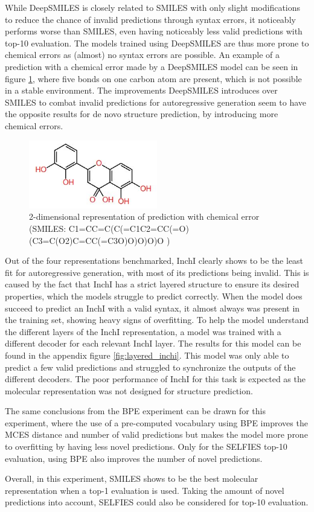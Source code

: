 While DeepSMILES is closely related to SMILES with only slight modifications to reduce the chance of invalid predictions through syntax errors, it noticeably performs worse than SMILES, even having noticeably less valid predictions with top-10 evaluation.
The models trained using DeepSMILES are thus more prone to chemical errors as (almost) no syntax errors are possible.
An example of a prediction with a chemical error made by a DeepSMILES model can be seen in figure \ref{fig:invalid_pred}, where five bonds on one carbon atom are present, which is not possible in a stable environment.
The improvements DeepSMILES introduces over SMILES to combat invalid predictions for autoregressive generation seem to have the opposite results for de novo structure prediction, by introducing more chemical errors.
\begin{figure}[h]
    \centering
    \includegraphics[width=0.5\textwidth]{figures/results/invalid_pred.JPG}
    \caption{2-dimensional representation of prediction with chemical error (SMILES: C1=CC=C(C(=C1C2=CC(=O)(C3=C(O2)C=CC(=C3O)O)O)O)O )}
    \label{fig:invalid_pred}
\end{figure}

Out of the four representations benchmarked, InchI clearly shows to be the least fit for autoregressive generation, with most of its predictions being invalid.
This is caused by the fact that InchI has a strict layered structure to ensure its desired properties, which the models struggle to predict correctly.
When the model does succeed to predict an InchI with a valid syntax, it almost always was present in the training set, showing heavy signs of overfitting.
To help the model understand the different layers of the InchI representation, a model was trained with a different decoder for each relevant InchI layer. 
The results for this model can be found in the appendix figure \ref{fig:layered_inchi}.
This model was only able to predict a few valid predictions and struggled to synchronize the outputs of the different decoders.
The poor performance of InchI for this task is expected as the molecular representation was not designed for structure prediction.

The same conclusions from the \ac{BPE} experiment can be drawn for this experiment, where the use of a pre-computed vocabulary using \ac{BPE} improves the MCES distance and number of valid predictions but makes the model more prone to overfitting by having less novel predictions.
Only for the SELFIES top-10 evaluation, using \ac{BPE} also improves the number of novel predictions.

Overall, in this experiment, SMILES shows to be the best molecular representation when a top-1 evaluation is used.
Taking the amount of novel predictions into account, SELFIES could also be considered for top-10 evaluation.
